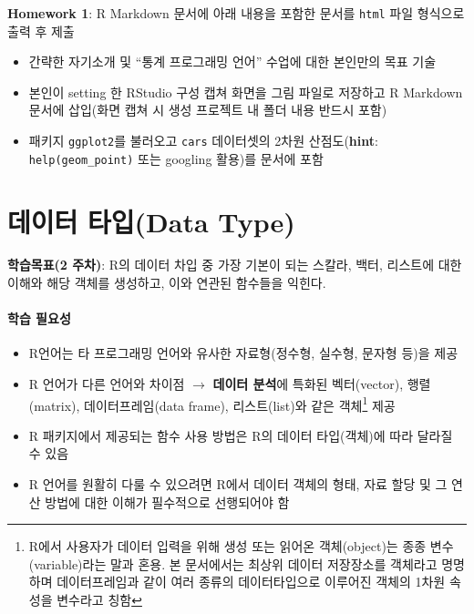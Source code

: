 \documentclass[
  11pt,
]{krantz}
\providecommand{\tightlist}{%
  \setlength{\itemsep}{0pt}\setlength{\parskip}{0pt}}
\let\BeginKnitrBlock\begin \let\EndKnitrBlock\end
\begin{document}
\normalsize

\footnotesize

\BeginKnitrBlock{rmdimportant}
\textbf{Homework 1}: R Markdown 문서에 아래 내용을 포함한 문서를 \texttt{html} 파일 형식으로 출력 후 제출

\begin{itemize}
\tightlist
\item
  간략한 자기소개 및 ``통계 프로그래밍 언어'' 수업에 대한 본인만의 목표 기술
\item
  본인이 setting 한 RStudio 구성 캡쳐 화면을 그림 파일로 저장하고 R Markdown 문서에 삽입(화면 캡쳐 시 생성 프로젝트 내 폴더 내용 반드시 포함)
\item
  패키지 \texttt{ggplot2}를 불러오고 \texttt{cars} 데이터셋의 2차원 산점도(\textbf{hint}: \texttt{help(geom\_point)} 또는 googling 활용)를 문서에 포함
\end{itemize}
\EndKnitrBlock{rmdimportant}

\normalsize

\hypertarget{data-type}{%
\chapter{데이터 타입(Data Type)}\label{data-type}}

\footnotesize

\BeginKnitrBlock{rmdnote}
\textbf{학습목표(2 주차)}: R의 데이터 차입 중 가장 기본이 되는 스칼라, 백터, 리스트에 대한 이해와 해당 객체를 생성하고, 이와 연관된 함수들을 익힌다.
\EndKnitrBlock{rmdnote}

\normalsize

\hypertarget{ch2-abstract}{%
\subsubsection*{학습 필요성}\label{ch2-abstract}}


\begin{itemize}
\tightlist
\item
  R언어는 타 프로그래밍 언어와 유사한 자료형(정수형, 실수형, 문자형 등)을 제공
\item
  R 언어가 다른 언어와 차이점 \(\rightarrow\) \textbf{데이터 분석}에 특화된 벡터(vector), 행렬(matrix), 데이터프레임(data frame), 리스트(list)와 같은 객체\footnote{R에서 사용자가 데이터 입력을 위해 생성 또는 읽어온 객체(object)는 종종 변수(variable)라는 말과 혼용. 본 문서에서는 최상위 데이터 저장장소를 객체라고 명명하며 데이터프레임과 같이 여러 종류의 데이터타입으로 이루어진 객체의 1차원 속성을 변수라고 칭함} 제공
\item
  R 패키지에서 제공되는 함수 사용 방법은 R의 데이터 타입(객체)에 따라 달라질 수 있음\\
\item
  R 언어를 원활히 다룰 수 있으려면 R에서 데이터 객체의 형태, 자료 할당 및 그 연산 방법에 대한 이해가 필수적으로 선행되어야 함
\end{itemize}
\end{document}
